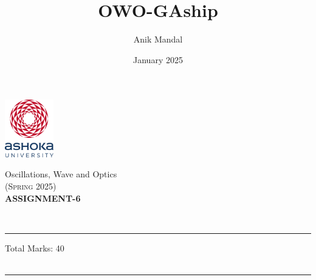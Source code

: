 \documentclass[12pt, a4paper]{article}
\title{OWO-GAship}
\author{Anik Mandal}
\date{January 2025}
\begin{document}
\begin{minipage}[t][][c]{0.1\textwidth}
    \begin{flushleft}
        \includegraphics[height=2.5cm]{tex-resources/Ashoka Logo.png}
    \end{flushleft}
\end{minipage}
\begin{minipage}[t][][c]{0.85\textwidth}
    \begin{center}
        {\LARGE Oscillations, Wave and Optics}\\ \vspace{0.5em}
        \textsc{(Spring 2025)}\\
        \vspace{1em}
        \textbf{\Large ASSIGNMENT-6} \\
    \end{center}
\end{minipage}
\vspace{10pt}\\
\rule[0em]{\textwidth}{0.75pt}

\hfill 
Total Marks: 40   \\
\hfill
{}\\
\vspace{.2cm}
\rule[0em]{\textwidth}{1.75pt}
\vspace{-1cm}
\justifying
\end{document}
